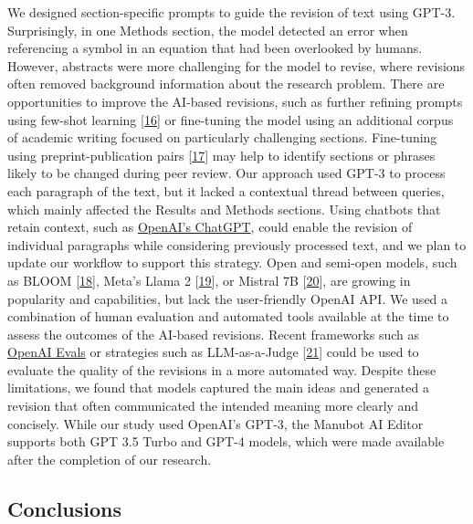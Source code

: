 \documentclass[
]{article}
\begin{document}
We designed section-specific prompts to guide the revision of text using GPT-3.
Surprisingly, in one Methods section, the model detected an error when referencing a symbol in an equation that had been overlooked by humans.
However, abstracts were more challenging for the model to revise, where revisions often removed background information about the research problem.
There are opportunities to improve the AI-based revisions, such as further refining prompts using few-shot learning {[}\protect\hyperlink{ref-S1Lim9f9}{16}{]} or fine-tuning the model using an additional corpus of academic writing focused on particularly challenging sections.
Fine-tuning using preprint-publication pairs {[}\protect\hyperlink{ref-WVt383GU}{17}{]} may help to identify sections or phrases likely to be changed during peer review.
Our approach used GPT-3 to process each paragraph of the text, but it lacked a contextual thread between queries, which mainly affected the Results and Methods sections.
Using chatbots that retain context, such as \href{https://openai.com/blog/chatgpt}{OpenAI's ChatGPT}, could enable the revision of individual paragraphs while considering previously processed text, and we plan to update our workflow to support this strategy.
Open and semi-open models, such as BLOOM {[}\protect\hyperlink{ref-I4d1F0yv}{18}{]}, Meta's Llama 2 {[}\protect\hyperlink{ref-A213xAuD}{19}{]}, or Mistral 7B {[}\protect\hyperlink{ref-1wOalSCp}{20}{]}, are growing in popularity and capabilities, but lack the user-friendly OpenAI API.
We used a combination of human evaluation and automated tools available at the time to assess the outcomes of the AI-based revisions.
Recent frameworks such as \href{https://github.com/openai/evals}{OpenAI Evals} or strategies such as LLM-as-a-Judge {[}\protect\hyperlink{ref-LhEwBH2w}{21}{]} could be used to evaluate the quality of the revisions in a more automated way.
Despite these limitations, we found that models captured the main ideas and generated a revision that often communicated the intended meaning more clearly and concisely.
While our study used OpenAI's GPT-3, the Manubot AI Editor supports both GPT 3.5 Turbo and GPT-4 models, which were made available after the completion of our research.

\hypertarget{conclusions}{%
\subsection{Conclusions}\label{conclusions}}
\end{document}
